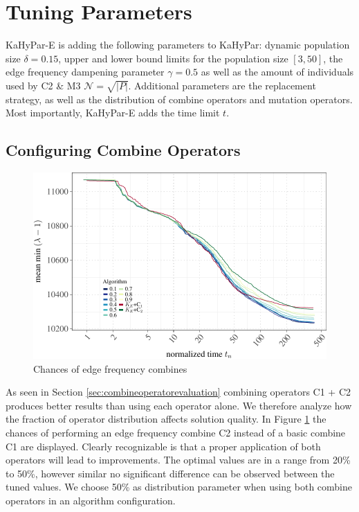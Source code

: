 \documentclass[a4paper,12pt,titlepage, BCOR7mm,headsepline]{scrbook}
\numberwithin{equation}{section}
\begin{document}
\section{Tuning Parameters}
KaHyPar-E is adding the following parameters to KaHyPar: dynamic population size $\delta = 0.15$, upper and lower bound limits for the population size $[3,50]$, the edge frequency dampening parameter $\gamma = 0.5$ as well as the amount of individuals used by C2 \& M3 $\mathcal{N} = \sqrt{|P|}$. Additional parameters are the replacement strategy, as well as the distribution of combine operators and mutation operators. Most importantly, KaHyPar-E adds the time limit $t$. %
\subsection{Configuring Combine Operators}

\begin{figure}[H]

\begin{center}
\includegraphics{rnw/tuning_subset_plots/edge_tuning_plot-1}\caption{Chances of edge frequency combines}\label{edge_tuning}
\end{center}
\end{figure}
As seen in Section \ref{sec:combineoperatorevaluation} combining operators C1 + C2 produces better results than using each operator alone. We therefore analyze how the fraction of operator distribution affects solution quality.
In Figure \ref{edge_tuning} the chances of performing an edge frequency combine C2 instead of a basic combine C1 are displayed. Clearly recognizable is that a proper application of both operators will lead to improvements. The optimal values are in a range from 20\% to 50\%, however similar no significant difference can be observed between the tuned values. We choose 50\% as distribution parameter when using both combine operators in an algorithm configuration.
\end{document}
